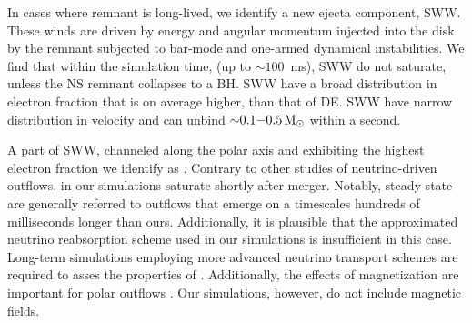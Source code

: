 In cases where \pmerg{} remnant is long-lived, we identify a new ejecta component, 
\ac{SWW}. These winds are driven by energy and angular momentum injected into the 
disk by the remnant subjected to bar-mode and one-armed dynamical instabilities.
We find that within the simulation time, (up to ${\sim}100$~ms), \ac{SWW} do not 
saturate, unless the \ac{NS} remnant collapses to a \ac{BH}.
\ac{SWW} have a broad distribution in electron fraction that is on average higher,
than that of \ac{DE}. 
\ac{SWW} have narrow distribution in velocity and can unbind
${\sim}0.1{-}0.5\, {\text{M}_{\odot}}$ within a second.

A part of \ac{SWW}, channeled along the polar axis and exhibiting the highest
electron fraction we identify as \nwind{}. Contrary to other studies of 
neutrino-driven outflows, \citep[\eg][]{Dessart:2008zd,Perego:2014fma,Fujibayashi:2020dvr}
\nwind{} in our simulations saturate shortly after merger.
%
Notably, steady state \nwind{} are generally referred to outflows 
that emerge on a timescales hundreds of milliseconds longer than ours. 
Additionally, it is plausible that the approximated neutrino reabsorption 
scheme used in our simulations is insufficient in this case. 
Long-term simulations employing more advanced 
neutrino transport schemes are required to asses the properties of \nwind.
%
Additionally, the effects of magnetization are important for polar outflows 
\citep{Siegel:2017nub,Metzger:2018uni,Fernandez:2018kax,Miller:2019dpt,Mosta:2020hlh}.
Our simulations, however, do not include magnetic fields. 

